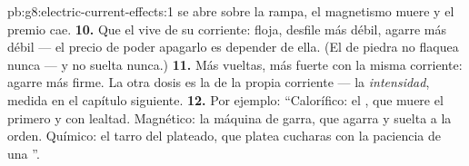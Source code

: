 \begin{solution}{pb:g8:electric-current-effects:1}
 se abre sobre la rampa, el magnetismo muere y el
premio cae.
\textbf{10.} Que el  vive de su corriente:
 floja, desfile más débil, agarre más débil --- el precio de
poder apagarlo es depender de ella. (El  de piedra no flaquea
nunca --- y no suelta nunca.)
\textbf{11.} Más vueltas,  más fuerte con la misma corriente:
agarre más firme. La otra dosis es la  de la propia corriente
--- la \emph{intensidad}, medida en el capítulo siguiente.
\textbf{12.} Por ejemplo: ``Calorífico: el , que muere el
primero y con lealtad. Magnético: la máquina de garra, que agarra y
suelta a la orden. Químico: el tarro del plateado, que platea cucharas
con la paciencia de una ''.
\end{solution}
